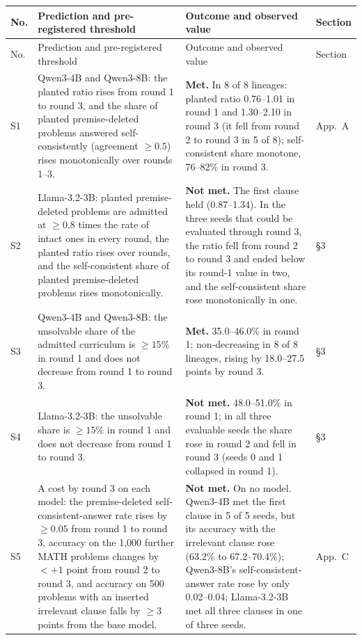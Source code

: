 \documentclass[10pt,a4paper]{article}
\newcommand{\met}{\textbf{Met.}}
\newcommand{\nmet}{\textbf{Not met.}}
\begin{document}
\begingroup\small
\begin{longtable}{@{}L{0.9cm}L{7.8cm}L{6.1cm}L{1.3cm}@{}}
\toprule
No. & Prediction and pre-registered threshold & Outcome and observed value & Section \\
\midrule
\endfirsthead
\toprule
No. & Prediction and pre-registered threshold & Outcome and observed value & Section \\
\midrule
\endhead
\bottomrule
\endfoot
S1 & Qwen3-4B and Qwen3-8B: the planted ratio rises from round 1 to round 3, and the share of planted premise-deleted problems answered self-consistently (agreement $\ge 0.5$) rises monotonically over rounds 1--3. & \met{} In 8 of 8 lineages: planted ratio 0.76--1.01 in round 1 and 1.30--2.10 in round 3 (it fell from round 2 to round 3 in 5 of 8); self-consistent share monotone, 76--82\% in round 3. & App.~A \\
S2 & Llama-3.2-3B: planted premise-deleted problems are admitted at $\ge 0.8$ times the rate of intact ones in every round, the planted ratio rises over rounds, and the self-consistent share of planted premise-deleted problems rises monotonically. & \nmet{} The first clause held (0.87--1.34). In the three seeds that could be evaluated through round 3, the ratio fell from round 2 to round 3 and ended below its round-1 value in two, and the self-consistent share rose monotonically in one. & \S3 \\
S3 & Qwen3-4B and Qwen3-8B: the unsolvable share of the admitted curriculum is $\ge 15\%$ in round 1 and does not decrease from round 1 to round 3. & \met{} 35.0--46.0\% in round 1; non-decreasing in 8 of 8 lineages, rising by 18.0--27.5 points by round 3. & \S3 \\
S4 & Llama-3.2-3B: the unsolvable share is $\ge 15\%$ in round 1 and does not decrease from round 1 to round 3. & \nmet{} 48.0--51.0\% in round 1; in all three evaluable seeds the share rose in round 2 and fell in round 3 (seeds 0 and 1 collapsed in round 1). & \S3 \\
S5 & A cost by round 3 on each model: the premise-deleted self-consistent-answer rate rises by $\ge 0.05$ from round 1 to round 3, accuracy on the 1,000 further MATH problems changes by $< +1$ point from round 2 to round 3, and accuracy on 500 problems with an inserted irrelevant clause falls by $\ge 3$ points from the base model. & \nmet{} On no model. Qwen3-4B met the first clause in 5 of 5 seeds, but its accuracy with the irrelevant clause rose (63.2\% to 67.2--70.4\%); Qwen3-8B's self-consistent-answer rate rose by only 0.02--0.04; Llama-3.2-3B met all three clauses in one of three seeds. & App.~C \\

\end{longtable}
\end{document}
